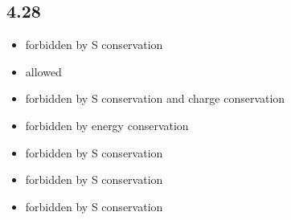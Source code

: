\documentclass{article}
\begin{document}
\begin{CJK*}{GBK}{song}
\section{4.28}
\begin{itemize}
\item forbidden by S conservation
\item allowed
\item forbidden by S conservation and charge conservation
\item forbidden by energy conservation
\item forbidden by S conservation
\item forbidden by S conservation
\item forbidden by S conservation
\end{itemize}




\end{CJK*}
\end{document}
